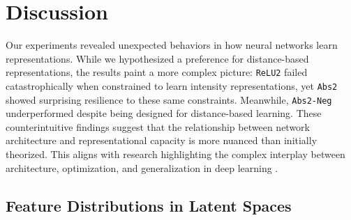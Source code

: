 \section{Discussion}
\label{sec:discussion}

Our experiments revealed unexpected behaviors in how neural networks learn representations. While we hypothesized a preference for distance-based representations, the results paint a more complex picture: \texttt{ReLU2} failed catastrophically when constrained to learn intensity representations, yet \texttt{Abs2} showed surprising resilience to these same constraints. Meanwhile, \texttt{Abs2-Neg} underperformed despite being designed for distance-based learning. These counterintuitive findings suggest that the relationship between network architecture and representational capacity is more nuanced than initially theorized. This aligns with research highlighting the complex interplay between architecture, optimization, and generalization in deep learning \cite{bengio2013representation, jacot2018neural, lee2019wide}.

\subsection{Feature Distributions in Latent Spaces}

